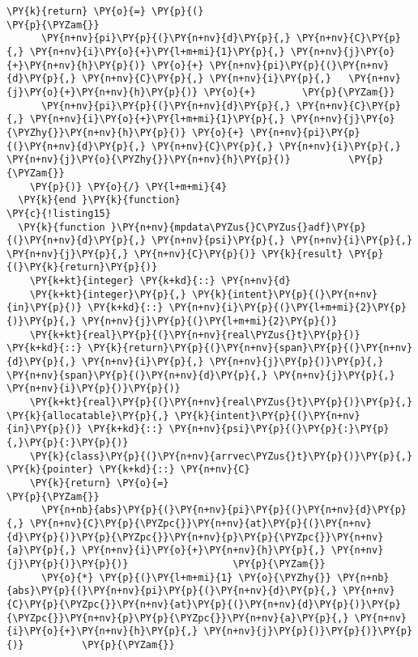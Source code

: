 \begin{Verbatim}[commandchars=\\\{\}]
    \PY{k}{return} \PY{o}{=} \PY{p}{(}                                         \PY{p}{\PYZam{}}
      \PY{n+nv}{pi}\PY{p}{(}\PY{n+nv}{d}\PY{p}{,} \PY{n+nv}{C}\PY{p}{,} \PY{n+nv}{i}\PY{o}{+}\PY{l+m+mi}{1}\PY{p}{,} \PY{n+nv}{j}\PY{o}{+}\PY{n+nv}{h}\PY{p}{)} \PY{o}{+} \PY{n+nv}{pi}\PY{p}{(}\PY{n+nv}{d}\PY{p}{,} \PY{n+nv}{C}\PY{p}{,} \PY{n+nv}{i}\PY{p}{,}   \PY{n+nv}{j}\PY{o}{+}\PY{n+nv}{h}\PY{p}{)} \PY{o}{+}        \PY{p}{\PYZam{}}
      \PY{n+nv}{pi}\PY{p}{(}\PY{n+nv}{d}\PY{p}{,} \PY{n+nv}{C}\PY{p}{,} \PY{n+nv}{i}\PY{o}{+}\PY{l+m+mi}{1}\PY{p}{,} \PY{n+nv}{j}\PY{o}{\PYZhy{}}\PY{n+nv}{h}\PY{p}{)} \PY{o}{+} \PY{n+nv}{pi}\PY{p}{(}\PY{n+nv}{d}\PY{p}{,} \PY{n+nv}{C}\PY{p}{,} \PY{n+nv}{i}\PY{p}{,}   \PY{n+nv}{j}\PY{o}{\PYZhy{}}\PY{n+nv}{h}\PY{p}{)}          \PY{p}{\PYZam{}}
    \PY{p}{)} \PY{o}{/} \PY{l+m+mi}{4}               
  \PY{k}{end }\PY{k}{function}
\PY{c}{!listing15}
  \PY{k}{function }\PY{n+nv}{mpdata\PYZus{}C\PYZus{}adf}\PY{p}{(}\PY{n+nv}{d}\PY{p}{,} \PY{n+nv}{psi}\PY{p}{,} \PY{n+nv}{i}\PY{p}{,} \PY{n+nv}{j}\PY{p}{,} \PY{n+nv}{C}\PY{p}{)} \PY{k}{result} \PY{p}{(}\PY{k}{return}\PY{p}{)}
    \PY{k+kt}{integer} \PY{k+kd}{::} \PY{n+nv}{d}
    \PY{k+kt}{integer}\PY{p}{,} \PY{k}{intent}\PY{p}{(}\PY{n+nv}{in}\PY{p}{)} \PY{k+kd}{::} \PY{n+nv}{i}\PY{p}{(}\PY{l+m+mi}{2}\PY{p}{)}\PY{p}{,} \PY{n+nv}{j}\PY{p}{(}\PY{l+m+mi}{2}\PY{p}{)}
    \PY{k+kt}{real}\PY{p}{(}\PY{n+nv}{real\PYZus{}t}\PY{p}{)} \PY{k+kd}{::} \PY{k}{return}\PY{p}{(}\PY{n+nv}{span}\PY{p}{(}\PY{n+nv}{d}\PY{p}{,} \PY{n+nv}{i}\PY{p}{,} \PY{n+nv}{j}\PY{p}{)}\PY{p}{,} \PY{n+nv}{span}\PY{p}{(}\PY{n+nv}{d}\PY{p}{,} \PY{n+nv}{j}\PY{p}{,} \PY{n+nv}{i}\PY{p}{)}\PY{p}{)}
    \PY{k+kt}{real}\PY{p}{(}\PY{n+nv}{real\PYZus{}t}\PY{p}{)}\PY{p}{,} \PY{k}{allocatable}\PY{p}{,} \PY{k}{intent}\PY{p}{(}\PY{n+nv}{in}\PY{p}{)} \PY{k+kd}{::} \PY{n+nv}{psi}\PY{p}{(}\PY{p}{:}\PY{p}{,}\PY{p}{:}\PY{p}{)} 
    \PY{k}{class}\PY{p}{(}\PY{n+nv}{arrvec\PYZus{}t}\PY{p}{)}\PY{p}{,} \PY{k}{pointer} \PY{k+kd}{::} \PY{n+nv}{C}
    \PY{k}{return} \PY{o}{=}                                           \PY{p}{\PYZam{}}
      \PY{n+nb}{abs}\PY{p}{(}\PY{n+nv}{pi}\PY{p}{(}\PY{n+nv}{d}\PY{p}{,} \PY{n+nv}{C}\PY{p}{\PYZpc{}}\PY{n+nv}{at}\PY{p}{(}\PY{n+nv}{d}\PY{p}{)}\PY{p}{\PYZpc{}}\PY{n+nv}{p}\PY{p}{\PYZpc{}}\PY{n+nv}{a}\PY{p}{,} \PY{n+nv}{i}\PY{o}{+}\PY{n+nv}{h}\PY{p}{,} \PY{n+nv}{j}\PY{p}{)}\PY{p}{)}                  \PY{p}{\PYZam{}}
      \PY{o}{*} \PY{p}{(}\PY{l+m+mi}{1} \PY{o}{\PYZhy{}} \PY{n+nb}{abs}\PY{p}{(}\PY{n+nv}{pi}\PY{p}{(}\PY{n+nv}{d}\PY{p}{,} \PY{n+nv}{C}\PY{p}{\PYZpc{}}\PY{n+nv}{at}\PY{p}{(}\PY{n+nv}{d}\PY{p}{)}\PY{p}{\PYZpc{}}\PY{n+nv}{p}\PY{p}{\PYZpc{}}\PY{n+nv}{a}\PY{p}{,} \PY{n+nv}{i}\PY{o}{+}\PY{n+nv}{h}\PY{p}{,} \PY{n+nv}{j}\PY{p}{)}\PY{p}{)}\PY{p}{)}          \PY{p}{\PYZam{}}

\end{Verbatim}
